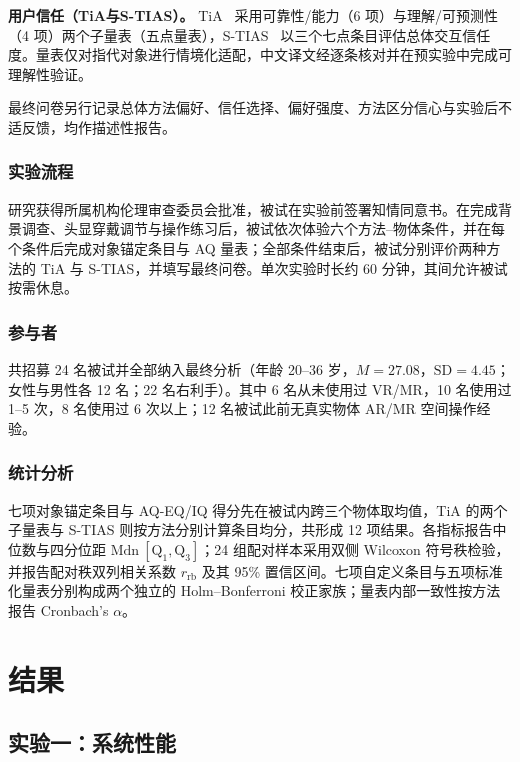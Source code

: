 \documentclass[review]{vgtc}
\begin{document}
\textbf{用户信任（TiA与S-TIAS）。}
TiA~\cite{tia2019} 采用可靠性/能力（6 项）与理解/可预测性（4 项）两个子量表（五点量表），S-TIAS~\cite{stias2025} 以三个七点条目评估总体交互信任度。量表仅对指代对象进行情境化适配，中文译文经逐条核对并在预实验中完成可理解性验证。

最终问卷另行记录总体方法偏好、信任选择、偏好强度、方法区分信心与实验后不适反馈，均作描述性报告。

\subsubsection{实验流程}

研究获得所属机构伦理审查委员会批准，被试在实验前签署知情同意书。在完成背景调查、头显穿戴调节与操作练习后，被试依次体验六个方法--物体条件，并在每个条件后完成对象锚定条目与 AQ 量表；全部条件结束后，被试分别评价两种方法的 TiA 与 S-TIAS，并填写最终问卷。单次实验时长约 60 分钟，其间允许被试按需休息。

\subsubsection{参与者}

共招募 24 名被试并全部纳入最终分析（年龄 20--36 岁，$M=27.08$，$\mathrm{SD}=4.45$；女性与男性各 12 名；22 名右利手）。其中 6 名从未使用过 VR/MR，10 名使用过 1--5 次，8 名使用过 6 次以上；12 名被试此前无真实物体 AR/MR 空间操作经验。

\subsubsection{统计分析}

七项对象锚定条目与 AQ-EQ/IQ 得分先在被试内跨三个物体取均值，TiA 的两个子量表与 S-TIAS 则按方法分别计算条目均分，共形成 12 项结果。各指标报告中位数与四分位距 $\mathrm{Mdn}\ [\mathrm{Q}_1, \mathrm{Q}_3]$；24 组配对样本采用双侧 Wilcoxon 符号秩检验，并报告配对秩双列相关系数 $r_{\mathrm{rb}}$ 及其 95\% 置信区间。七项自定义条目与五项标准化量表分别构成两个独立的 Holm--Bonferroni 校正家族；量表内部一致性按方法报告 Cronbach's $\alpha$。

\section{结果}\label{sec:results}

\subsection{实验一：系统性能}
\end{document}
